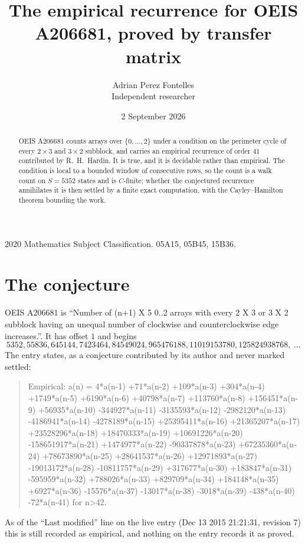 \documentclass[11pt,a4paper]{article}
\title{The empirical recurrence for OEIS A206681, proved by transfer matrix}
\author{Adrian Perez Fontelles\\ \small Independent researcher}
\date{2 September 2026}
\theoremstyle{plain}
\theoremstyle{definition}
\begin{document}
\maketitle

\begin{abstract}
OEIS A206681 counts arrays over $\{0,\dots,2\}$ under a condition on the perimeter cycle of
every $2\times3$ and $3\times2$ subblock, and carries an empirical recurrence of order $41$ contributed by
R.~H.~Hardin. It is true, and it is decidable rather than empirical. The condition is local to
a bounded window of consecutive rows, so the count is a walk count on $S=5352$ states and is
$C$-finite; whether the conjectured recurrence annihilates it is then settled by a finite exact
computation, with the Cayley--Hamilton theorem bounding the work.
\end{abstract}

\noindent\small 2020 Mathematics Subject Classification. 05A15, 05B45, 15B36.\normalsize

\section{The conjecture}

OEIS A206681 is ``Number of (n+1) X 5 0..2 arrays with every 2 X 3 or 3 X 2 subblock having an unequal number of clockwise and counterclockwise edge increases.''. It has offset $1$ and begins
\[
5352, 55836, 645144, 7423464, 84549024, 965476188, 11019153780, 125824938768,\ \dots
\]
The entry states, as a conjecture contributed by its author and never marked settled:
\begin{quote}
Empirical: a(n) = 4*a(n-1) +71*a(n-2) +109*a(n-3) +304*a(n-4) +1749*a(n-5) +6190*a(n-6) +40798*a(n-7) +113760*a(n-8) +156451*a(n-9) +56935*a(n-10) -344927*a(n-11) -3135593*a(n-12) -2982120*a(n-13) -4186941*a(n-14) -4278189*a(n-15) +25395411*a(n-16) +21365207*a(n-17) +23528296*a(n-18) +18470333*a(n-19) +10691226*a(n-20) -158651917*a(n-21) +1474977*a(n-22) -90337878*a(n-23) +67235360*a(n-24) +78673890*a(n-25) +28641537*a(n-26) +12971893*a(n-27) -19013172*a(n-28) -10811757*a(n-29) +317677*a(n-30) +183847*a(n-31) -595959*a(n-32) +788026*a(n-33) +829709*a(n-34) +184148*a(n-35) +6927*a(n-36) -15576*a(n-37) -13017*a(n-38) -3018*a(n-39) -438*a(n-40) -72*a(n-41) for n>42.
\end{quote}
As of the ``Last modified'' line on the live entry (Dec 13 2015 21:21:31, revision 7) this is still
recorded as empirical, and nothing on the entry records it as proved.
\end{document}
